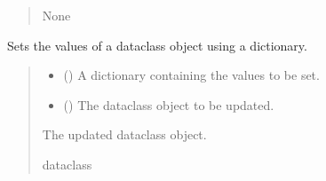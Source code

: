 \documentclass[a4paper,11pt,english,openany]{sphinxmanual}
\begin{document}
\begin{fulllineitems}
\begin{fulllineitems}
\begin{quote}
\begin{description}
\sphinxAtStartPar
None

\end{description}\end{quote}

\end{fulllineitems}


\begin{fulllineitems}
\label{\detokenize{api/spyice.postprocess.analysis:src.spyice.postprocess.analysis.Analysis.set_dataclass}}
\pysigstartsignatures
\pysiglinewithargsret
{}
{\sphinxparamcomma {}}
{}
\pysigstopsignatures
\sphinxAtStartPar
Sets the values of a dataclass object using a dictionary.
\begin{quote}\begin{description}
\begin{itemize}
\item {} 
\sphinxAtStartPar
{} () \textendash{} A dictionary containing the values to be set.

\item {} 
\sphinxAtStartPar
{} () \textendash{} The dataclass object to be updated.

\end{itemize}

\sphinxAtStartPar
The updated dataclass object.

\sphinxAtStartPar
dataclass

\end{description}\end{quote}

\end{fulllineitems}



\end{fulllineitems}
\end{document}
